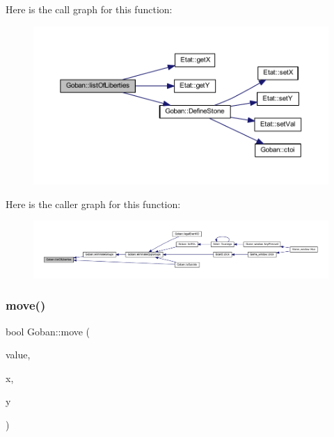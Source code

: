 Here is the call graph for this function\+:\nopagebreak
\begin{figure}[H]
\begin{center}
\leavevmode
\includegraphics[width=350pt]{class_goban_a84f36324eb9ddc29f522d481f04c13e7_cgraph}
\end{center}
\end{figure}
Here is the caller graph for this function\+:\nopagebreak
\begin{figure}[H]
\begin{center}
\leavevmode
\includegraphics[width=350pt]{class_goban_a84f36324eb9ddc29f522d481f04c13e7_icgraph}
\end{center}
\end{figure}
\mbox{\label{class_goban_a7dd1a7b53322bde2a831a923059e43a3}} 
\subsubsection{\texorpdfstring{move()}{move()}}
{\footnotesize\ttfamily bool Goban\+::move (\begin{DoxyParamCaption}\item[{const \hyperlink{class_etat_af3ddb2296ffc379b7f3ad2bf832f294e}{Etat\+::\+V\+AL} \&}]{value,  }\item[{const int \&}]{x,  }\item[{const int \&}]{y }\end{DoxyParamCaption})}

